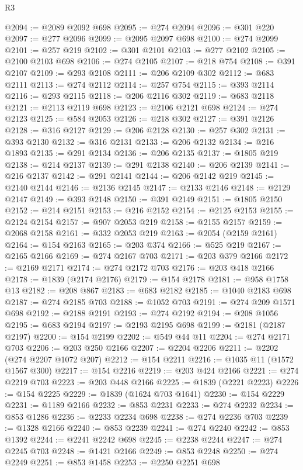 \begin{lexlean}{R3}
\begin{coremodule}
@2094 := @2089 @2092 @698
@2095 := @274 @2094
@2096 := @301 @220
@2097 := @277 @2096
@2099 := @2095 @2097 @698
@2100 := @274 @2099
@2101 := @257 @219
@2102 := @301 @2101
@2103 := @277 @2102
@2105 := @2100 @2103 @698
@2106 := @274 @2105
@2107 := @218 @754
@2108 := @391 @2107
@2109 := @293 @2108
@2111 := @206 @2109 @302
@2112 := @683 @2111
@2113 := @274 @2112
@2114 := @257 @754
@2115 := @393 @2114
@2116 := @293 @2115
@2118 := @206 @2116 @302
@2119 := @683 @2118
@2121 := @2113 @2119 @698
@2123 := @2106 @2121 @698
@2124 := @274 @2123
@2125 := @584 @2053
@2126 := @218 @302
@2127 := @391 @2126
@2128 := @316 @2127
@2129 := @206 @2128
@2130 := @257 @302
@2131 := @393 @2130
@2132 := @316 @2131
@2133 := @206 @2132
@2134 := @216 @1893
@2135 := @291 @2134
@2136 := @206 @2135
@2137 := @1805 @219
@2138 := @214 @2137
@2139 := @291 @2138
@2140 := @206 @2139
@2141 := @216 @2137
@2142 := @291 @2141
@2144 := @206 @2142 @219
@2145 := @2140 @2144
@2146 := @2136 @2145
@2147 := @2133 @2146
@2148 := @2129 @2147
@2149 := @393 @2148
@2150 := @391 @2149
@2151 := @1805 @2150
@2152 := @214 @2151
@2153 := @216 @2152
@2154 := @2125 @2153
@2155 := @2124 @2154
@2157 := @907 @2053 @219
@2158 := @2155 @2157
@2159 := @2068 @2158
@2161 := @332 @2053 @219
@2163 := @2054 (@2159 @2161)
@2164 := @154 @2163
@2165 := @203 @374
@2166 := @525 @219
@2167 := @2165 @2166
@2169 := @274 @2167 @703
@2171 := @203 @379 @2166
@2172 := @2169 @2171
@2174 := @274 @2172 @703
@2176 := @203 @418 @2166
@2178 := @1839 (@2174 @2176)
@2179 := @154 @2178
@2181 := @958 @1758 @13
@2182 := @208 @867
@2183 := @683 @2182
@2185 := @1040 @2183 @698
@2187 := @274 @2185 @703
@2188 := @1052 @703
@2191 := @274 @209 @1571 @698
@2192 := @2188 @2191
@2193 := @274 @2192
@2194 := @208 @1056
@2195 := @683 @2194
@2197 := @2193 @2195 @698
@2199 := @2181 (@2187 @2197)
@2200 := @154 @2199
@2202 := @549 @44 @11
@2204 := @274 @2171 @703
@2206 := @203 @250 @2166
@2207 := @2204 @2206
@2211 := @2202 (@274 @2207 @1072 @207)
@2212 := @154 @2211
@2216 := @1035 @11 (@1572 @1567 @300)
@2217 := @154 @2216
@2219 := @203 @424 @2166
@2221 := @274 @2219 @703
@2223 := @203 @448 @2166
@2225 := @1839 (@2221 @2223)
@2226 := @154 @2225
@2229 := @1839 (@1624 @703 @1641)
@2230 := @154 @2229
@2231 := @1189 @2166
@2232 := @853 @2231
@2233 := @274 @2232
@2234 := @853 @1286
@2236 := @2233 @2234 @698
@2238 := @274 @2236 @703
@2239 := @1328 @2166
@2240 := @853 @2239
@2241 := @274 @2240
@2242 := @853 @1392
@2244 := @2241 @2242 @698
@2245 := @2238 @2244
@2247 := @274 @2245 @703
@2248 := @1421 @2166
@2249 := @853 @2248
@2250 := @274 @2249
@2251 := @853 @1458
@2253 := @2250 @2251 @698

\end{coremodule}
\end{lexlean}
